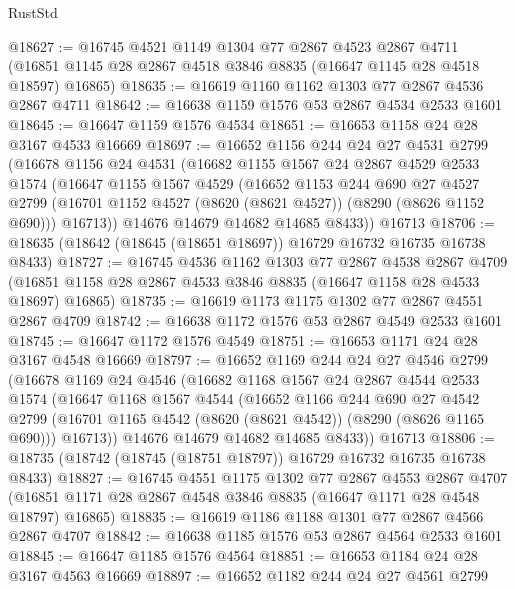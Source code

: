 \begin{lexlean}{RustStd}
\begin{coremodule}
@18627 := @16745
    @4521
    @1149
    @1304
    @77
    @2867
    @4523
    @2867
    @4711
    (@16851 @1145 @28 @2867 @4518 @3846 @8835 (@16647 @1145 @28 @4518 @18597) @16865)
@18635 := @16619 @1160 @1162 @1303 @77 @2867 @4536 @2867 @4711
@18642 := @16638 @1159 @1576 @53 @2867 @4534 @2533 @1601
@18645 := @16647 @1159 @1576 @4534
@18651 := @16653 @1158 @24 @28 @3167 @4533 @16669
@18697 := @16652
    @1156
    @244
    @24
    @27
    @4531
    @2799
    (@16678
      @1156
      @24
      @4531
      (@16682
        @1155
        @1567
        @24
        @2867
        @4529
        @2533
        @1574
        (@16647
          @1155
          @1567
          @4529
          (@16652
            @1153
            @244
            @690
            @27
            @4527
            @2799
            (@16701 @1152 @4527 (@8620 (@8621 @4527)) (@8290 (@8626 @1152 @690)))
            @16713))
        @14676
        @14679
        @14682
        @14685
        @8433))
    @16713
@18706 := @18635 (@18642 (@18645 (@18651 @18697)) @16729 @16732 @16735 @16738 @8433)
@18727 := @16745
    @4536
    @1162
    @1303
    @77
    @2867
    @4538
    @2867
    @4709
    (@16851 @1158 @28 @2867 @4533 @3846 @8835 (@16647 @1158 @28 @4533 @18697) @16865)
@18735 := @16619 @1173 @1175 @1302 @77 @2867 @4551 @2867 @4709
@18742 := @16638 @1172 @1576 @53 @2867 @4549 @2533 @1601
@18745 := @16647 @1172 @1576 @4549
@18751 := @16653 @1171 @24 @28 @3167 @4548 @16669
@18797 := @16652
    @1169
    @244
    @24
    @27
    @4546
    @2799
    (@16678
      @1169
      @24
      @4546
      (@16682
        @1168
        @1567
        @24
        @2867
        @4544
        @2533
        @1574
        (@16647
          @1168
          @1567
          @4544
          (@16652
            @1166
            @244
            @690
            @27
            @4542
            @2799
            (@16701 @1165 @4542 (@8620 (@8621 @4542)) (@8290 (@8626 @1165 @690)))
            @16713))
        @14676
        @14679
        @14682
        @14685
        @8433))
    @16713
@18806 := @18735 (@18742 (@18745 (@18751 @18797)) @16729 @16732 @16735 @16738 @8433)
@18827 := @16745
    @4551
    @1175
    @1302
    @77
    @2867
    @4553
    @2867
    @4707
    (@16851 @1171 @28 @2867 @4548 @3846 @8835 (@16647 @1171 @28 @4548 @18797) @16865)
@18835 := @16619 @1186 @1188 @1301 @77 @2867 @4566 @2867 @4707
@18842 := @16638 @1185 @1576 @53 @2867 @4564 @2533 @1601
@18845 := @16647 @1185 @1576 @4564
@18851 := @16653 @1184 @24 @28 @3167 @4563 @16669
@18897 := @16652
    @1182
    @244
    @24
    @27
    @4561
    @2799

\end{coremodule}
\end{lexlean}
